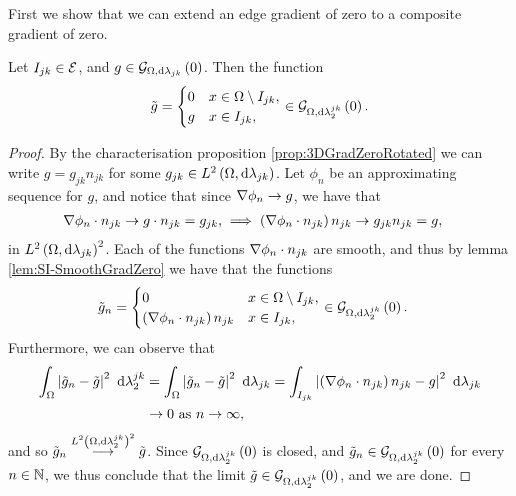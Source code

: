 First we show that we can extend an edge gradient of zero to a composite gradient of zero.
\begin{lemma} \label{lem:SI-GradZeroEdgeToComposite}
	Let $I_{jk}\in\mathcal{E}$, and $g\in\mathcal{G}_{ \Omega, \mathrm{d}\lambda_{jk}}\left( 0 \right)$.
	Then the function
	\begin{align*}
		\tilde{g} = \begin{cases} 0 & x\in\Omega\setminus I_{jk}, \\ g & x\in I_{jk}, \end{cases}
		\in\mathcal{G}_{ \Omega, \mathrm{d}\lambda_2^{jk}}\left( 0 \right).
	\end{align*}
\end{lemma}
\begin{proof}
	By the characterisation proposition \ref{prop:3DGradZeroRotated} we can write $g = g_{jk}n_{jk}$ for some $g_{jk}\in L^{2}\left( \Omega,\mathrm{d} \lambda_{jk} \right)$.
	Let $\phi_n$ be an approximating sequence for $g$, and notice that since $\nabla\phi_n\rightarrow g$, we have that
	\begin{align*}
		\nabla\phi_n\cdot n_{jk} \rightarrow g\cdot n_{jk} = g_{jk}, 
		&\implies
		\left(  \nabla\phi_n\cdot n_{jk}  \right)n_{jk} \rightarrow g_{jk}n_{jk} = g,
	\end{align*}
	in $L^{2}\left( \Omega,\mathrm{d} \lambda_{jk} \right)^2$.
	Each of the functions $\nabla\phi_n\cdot n_{jk}$ are smooth, and thus by lemma \ref{lem:SI-SmoothGradZero} we have that the functions
	\begin{align*}
		\tilde{g}_n &= \begin{cases} 0 & x\in\Omega\setminus I_{jk}, \\ \left(  \nabla\phi_n\cdot n_{jk}  \right)n_{jk} & x\in I_{jk}, \end{cases}
		\in\mathcal{G}_{ \Omega, \mathrm{d}\lambda_2^{jk}}\left( 0 \right).
	\end{align*}
	Furthermore, we can observe that
	\begin{align*}
		\int_{\Omega}\left\lvert  \tilde{g}_n - \tilde{g}  \right\rvert^2 \ \mathrm{d}\lambda_2^{jk}
		&= \int_{\Omega}\left\lvert  \tilde{g}_n - \tilde{g}  \right\rvert^2 \ \mathrm{d}\lambda_{jk}
		= \int_{I_{jk}}\left\lvert  \left(  \nabla\phi_n\cdot n_{jk}  \right)n_{jk} - g  \right\rvert^2 \ \mathrm{d}\lambda_{jk} \\
		&\rightarrow 0 \ \text{as} \ n \rightarrow\infty,
	\end{align*}
	and so $\tilde{g}_n\overset{L^{2}\left( \Omega,\mathrm{d} \lambda_2^{jk} \right)^2}{\longrightarrow}\tilde{g}$.
	Since $\mathcal{G}_{ \Omega, \mathrm{d}\lambda_2^{jk}}\left( 0 \right)$ is closed, and $\tilde{g}_n\in\mathcal{G}_{ \Omega, \mathrm{d}\lambda_2^{jk}}\left( 0 \right)$ for every $n\in\mathbb{N}$, we thus conclude that the limit $\tilde{g}\in\mathcal{G}_{ \Omega, \mathrm{d}\lambda_2^{jk}}\left( 0 \right)$, and we are done.
\end{proof}

